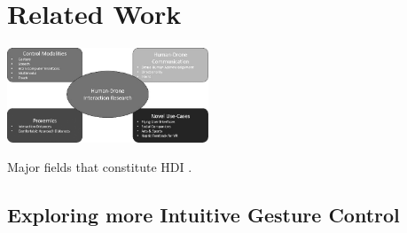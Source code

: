 \pagebreak
\section{Related Work}


\begin{marginfigure}%
    \vspace*{0.5cm}
    \includegraphics[width=6cm]{images/hdi_fields_bw.png}
    \caption{Major fields that constitute HDI \cite{tezza_andujar_2019}.}
    \label{hdi:fields}
\end{marginfigure}



\subsection{Exploring more Intuitive Gesture Control}



